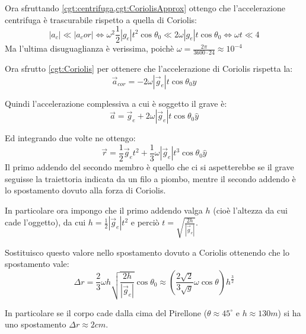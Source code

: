 \documentclass[../main.tex]{subfiles}
\begin{document}
Ora sfruttando \cref{cgt:centrifuga,cgt:CoriolisApprox} ottengo che l'accelerazione centrifuga è trascurabile rispetto
a quella di Coriolis:
\begin{equation*}
	|a_c|\ll|a_cor| \iff \omega^2\frac 12|g_e|t^2\cos \theta_0\ll 2\omega|g_e| t\cos \theta_0 \iff
	\omega t\ll 4
\end{equation*}
Ma l'ultima disuguaglianza è verissima, poichè $\omega=\frac{2\pi}{3600\cdot 24}\approx 10^{-4}$

Ora sfrutto \cref{cgt:Coriolis} per ottenere che l'accelerazione di Coriolis rispetta la:
\begin{equation*}
	\vec a_{cor}=-2\omega |\vec g_e| t \cos \theta_0 \hat y
\end{equation*}

Quindi l'accelerazione complessiva a cui è soggetto il grave è:
\begin{equation*}
	\vec a = \vec g_e + 2\omega |\vec g_e| t \cos \theta_0 \hat y
\end{equation*}

Ed integrando due volte ne ottengo:
\begin{equation*}
	\vec r = \frac 12 \vec g_e t^2 + \frac 13\omega |\vec g_e| t^3 \cos \theta_0 \hat y
\end{equation*}
Il primo addendo del secondo membro è quello che ci si aspetterebbe se il grave seguisse la traiettoria indicata da 
un filo a piombo, mentre il secondo addendo è lo spostamento dovuto alla forza di Coriolis.

In particolare ora impongo che il primo addendo valga $h$ (cioè l'altezza da cui cade l'oggetto), da cui 
$h=\frac 12 |\vec g_e| t^2$ e perciò $t=\sqrt{\frac{2h}{|\vec g_e|}}$.

Sostituisco questo valore nello spostamento dovuto a Coriolis ottenendo che lo spostamento vale:
\begin{equation}
	\Delta r = \frac 23\omega h \sqrt{\frac{2h}{|\vec g_e|}} \cos \theta_0 \approx
	\left(\frac {2\sqrt 2}{3\sqrt g} \omega \cos\theta\right) h^{\frac 32}
\end{equation}

In particolare se il corpo cade dalla cima del Pirellone ($\theta\approx 45^{\circ}$ e $h\approx 130m$) si ha
uno spostamento $\Delta r \approx 2cm$.
\end{document}

